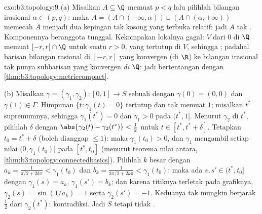 \begin{solution}{exo:b3:topology:9}
(a) Misalkan $A \subseteq \Q$ memuat $p < q$ lalu pilihlah bilangan irasional
$\alpha \in (p, q)$: maka $A = (A \cap (-\infty, \alpha)) \sqcup
(A\cap(\alpha, +\infty))$ memecah $A$ menjadi dua kepingan tak kosong yang
terbuka relatif: jadi $A$ tak . Komponennya beranggota tunggal.
Kekompakan lokalnya gagal:   $V$ dari $0$ di
$\Q$ memuat $[-r, r]\cap\Q$ untuk suatu $r > 0$, yang tertutup
di $V$, sehingga ; padahal barisan bilangan rasional di $[-r,r]$ yang
konvergen (di $\R$) ke bilangan irasional tak punya subbarisan yang
konvergen \emph{di $\Q$}: jadi bertentangan dengan
\cref{thm:b3:topology:metriccompact}.

(b) Misalkan $\gamma = (\gamma_1, \gamma_2) \colon [0,1] \to S$ sebuah
 dengan $\gamma(0) = (0,0)$ dan $\gamma(1) \in \Gamma$.
Himpunan $\{t : \gamma_1(t) = 0\}$ tertutup dan tak memuat
$1$; misalkan $t^*$ supremumnya, sehingga $\gamma_1(t^*) = 0$ dan
$\gamma_1 > 0$ pada $(t^*, 1]$. Menurut  $\gamma_2$ di
$t^*$, pilihlah $\delta$ dengan $\abs{\gamma_2(t) -
\gamma_2(t^*)} < \tfrac12$ untuk $t \in [t^*, t^* + \delta]$. Tetapkan
$t_0 = t^* + \delta$ (boleh dianggap $\leq 1$): maka $\gamma_1(t_0) > 0$,
dan $\gamma_1$ mengambil setiap nilai $(0, \gamma_1(t_0)]$ pada
$[t^*, t_0]$ (menurut teorema nilai antara,
\cref{thm:b3:topology:connectedbasics}). Pilihlah $k$ besar dengan
$a_k = \frac1{\pi/2 + 2k\pi} < \gamma_1(t_0)$ dan $b_k =
\frac1{3\pi/2 + 2k\pi} < \gamma_1(t_0)$: maka ada $s, s' \in
(t^*, t_0]$ dengan $\gamma_1(s) = a_k$, $\gamma_1(s') = b_k$;
dan karena titiknya terletak pada grafiknya, $\gamma_2(s) = \sin(1/a_k) =
1$ serta $\gamma_2(s') = -1$. Keduanya tak mungkin berjarak $\frac12$ dari
$\gamma_2(t^*)$: kontradiksi. Jadi $S$  tetapi tidak
.
\end{solution}


